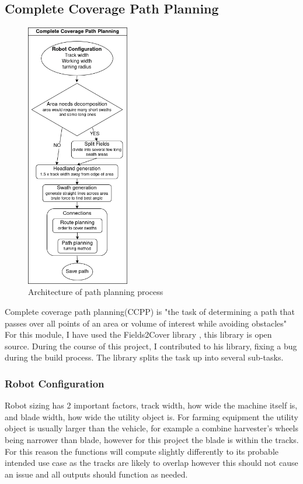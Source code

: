 \documentclass[final]{cmpreport_02}
\begin{document}
\subsection{Complete Coverage Path Planning}

\begin{figure}[H]
	\centering
	\includegraphics[width=0.4\textwidth]{./images/pathPlanning.drawio.png}
	\caption{Architecture of path planning process}
	\label{PP:arch}
\end{figure}


Complete coverage path planning(CCPP) is "the task of determining a path that passes over all points of an area or volume of interest while avoiding obstacles" \citep{zhao2023complete}
For this module, I have used the Fields2Cover library \citep{fields2cover}, this library is open source.
During the course of this project, I contributed to his library, fixing a bug during the build process.
The library splits the task up into several sub-tasks.


\subsubsection{Robot Configuration}
Robot sizing has 2 important factors, track width, how wide the machine itself is, and blade width, how wide the utility object is.
For farming equipment the utility object is usually larger than the vehicle, for example a combine harvester's wheels being narrower than blade, however for this project the blade is within the tracks.
For this reason the functions will compute slightly differently to its probable intended use case as the tracks are likely to overlap however this should not cause an issue and all outputs should function as needed.
\end{document}
